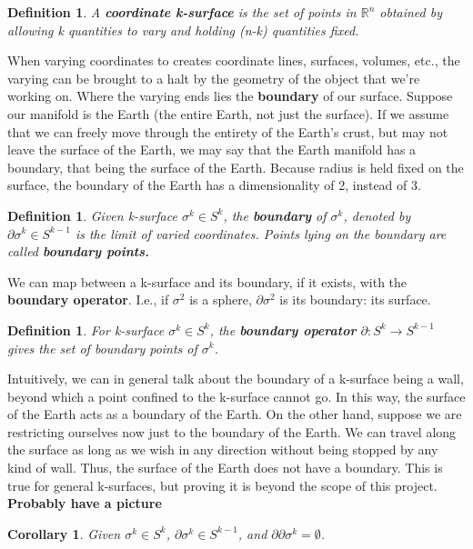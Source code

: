 \documentclass{book}
\newtheorem{defn}[equation]{Definition}
\newtheorem{coro}[equation]{Corollary}
\begin{document}
\begin{defn}
	A \textbf{coordinate k-surface} is the set of points in $\mathbb{R}^n$ obtained by allowing k quantities to vary and holding (n-k) quantities fixed.  
\end{defn}

When varying coordinates to creates coordinate lines, surfaces, volumes, etc., the varying can be brought to a halt by the geometry of the object that we're working on. Where the varying ends lies the \textbf{boundary} of our surface. Suppose our manifold is the Earth (the entire Earth, not just the surface). If we assume that we can freely move through the entirety of the Earth's crust, but may not leave the surface of the Earth, we may say that the Earth manifold has a boundary, that being the surface of the Earth. Because radius is held fixed on the surface, the boundary of the Earth has a dimensionality of 2, instead of 3. 

\begin{defn}
	Given k-surface $\sigma^k \in S^k$, the \textbf{boundary} of $\sigma^k$, denoted by $\partial\sigma^k \in S^{k-1}$ is the limit of varied coordinates. Points lying on the boundary are called \textbf{boundary points.}
\end{defn}

We can map between a k-surface and its boundary, if it exists, with the \textbf{boundary operator}. I.e., if $\sigma^2$ is a sphere, $\partial \sigma^2$ is its boundary: its surface. 

\begin{defn}
	For k-surface $\sigma^k \in S^k$, the \textbf{boundary operator} $\partial : S^k \to S^{k-1}$ gives the set of boundary points of $\sigma^k$. 
\end{defn}

Intuitively, we can in general talk about the boundary of a k-surface being a wall, beyond which a point confined to the k-surface cannot go. In this way, the surface of the Earth acts as a boundary of the Earth. On the other hand, suppose we are restricting ourselves now just to the boundary of the Earth. We can travel along the surface as long as we wish in any direction without being stopped by any kind of wall. Thus, the surface of the Earth does not have a boundary. This is true for general k-surfaces, but proving it is beyond the scope of this project. \textbf{Probably have a picture}




\begin{coro}
	Given $\sigma^k \in S^k$, $\partial \sigma^k \in S^{k-1}$, and $\partial\partial \sigma^k = \emptyset$. 
\end{coro}
\end{document}
